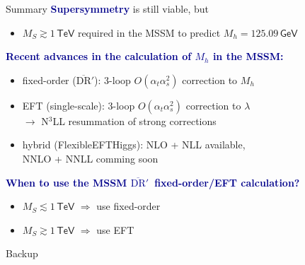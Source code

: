 \documentclass[hyperref={pdfpagelabels=false},ngerman]{beamer}
\newcommand{\eh}[1]{\,\mathsf{#1}}
\newcommand{\MS}{\ensuremath{M_S}}
\renewcommand{\emph}[1]{\textbf{\textcolor{darkblue}{#1}}}
\newcommand{\DRbarp}{\ensuremath{\overline{\text{DR}}'}}
\newcommand{\at}{\alpha_t}
\newcommand{\as}{\alpha_s}
\newcommand{\GeV}{\eh{GeV}}
\newcommand{\TeV}{\eh{TeV}}
\begin{document}
\begin{frame}{Summary}
  \emph{Supersymmetry} is still viable, but
  \begin{itemize}
  \item $\MS \gtrsim 1\TeV$ required in the MSSM to predict
    $M_h = 125.09\GeV$
  \end{itemize}
  \vspace{1em}
  \emph{Recent advances in the calculation of $M_h$ in the MSSM:}
  \begin{itemize}
  \item fixed-order (\DRbarp): 3-loop $O(\at\as^2)$ correction to $M_h$
  \item EFT (single-scale): 3-loop $O(\at\as^2)$ correction to $\lambda$ \\
    $\rightarrow$ N$^3$LL resummation of strong corrections
  \item hybrid (FlexibleEFTHiggs): NLO + NLL available, \\
    NNLO + NNLL comming soon
  \end{itemize}
  \vspace{1em}
  \emph{When to use the MSSM \DRbarp\ fixed-order/EFT calculation?}
  \begin{itemize}
  \item $\MS \lesssim 1\TeV$ $\Rightarrow$ use fixed-order
  \item $\MS \gtrsim  1\TeV$ $\Rightarrow$ use EFT
  \end{itemize}
\end{frame}


\begin{frame}[noframenumbering]
  \begin{center}
    \Huge Backup
  \end{center}
\end{frame}

\end{document}
